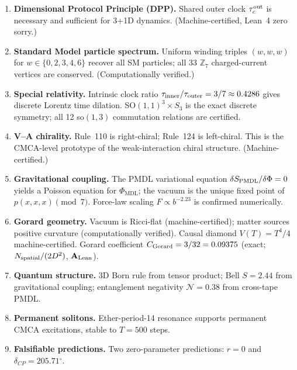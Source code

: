 \documentclass[11pt]{article}
\theoremstyle{remark}
\newcommand{\PHIMDL}{\Phi_{\mathrm{MDL}}}
\newcommand{\ZS}{\mathbb{Z}_7}
\newcommand{\CatAL}{\ensuremath{\textbf{A}_{\rm Lean}}}
\newcommand{\CMCA}{\text{CMCA}}
\newcommand{\taucout}{\tau_c^{\rm out}}
\newcommand{\taucratio}{\tau_{\rm inner}/\tau_{\rm outer}}
\newcommand{\PMDL}{S_{\rm PMDL}}
\begin{document}
\begin{enumerate}[label=(\arabic*)]
  \item \textbf{Dimensional Protocol Principle (DPP).} Shared outer clock
        $\taucout$ is necessary and sufficient for 3+1D dynamics.
        (Machine-certified, Lean~4 zero sorry.)

  \item \textbf{Standard Model particle spectrum.} Uniform winding triples
        $(w,w,w)$ for $w \in \{0,2,3,4,6\}$ recover all SM particles; all 33
        $\ZS$ charged-current vertices are conserved. (Computationally verified.)

  \item \textbf{Special relativity.} Intrinsic clock ratio $\taucratio = 3/7 \approx 0.4286$
        gives discrete Lorentz time dilation. SO$(1,1)^3 \times S_3$ is the exact
        discrete symmetry; all 12 so$(1,3)$ commutation relations are certified.

  \item \textbf{V--A chirality.} Rule~110 is right-chiral; Rule~124 is
        left-chiral. This is the $\CMCA$-level prototype of the weak-interaction
        chiral structure. (Machine-certified.)

  \item \textbf{Gravitational coupling.} The PMDL variational equation
        $\delta\PMDL/\delta\Phi = 0$ yields a Poisson equation for $\PHIMDL$;
        the vacuum is the unique fixed point of $p(x,x,x) \pmod{7}$.
        Force-law scaling $F \propto b^{-2.23}$ is confirmed numerically.

  \item \textbf{Gorard geometry.} Vacuum is Ricci-flat (machine-certified);
        matter sources positive curvature (computationally verified). Causal
        diamond $V(T) = T^4/4$ machine-certified. Gorard coefficient
        $C_{\rm Gorard} = 3/32 = 0.09375$ (exact; $N_{\rm spatial}/(2D^2)$, \CatAL).

  \item \textbf{Quantum structure.} 3D Born rule from tensor product; Bell
        $S = 2.44$ from gravitational coupling; entanglement negativity
        $\mathcal{N} = 0.38$ from cross-tape PMDL.

  \item \textbf{Permanent solitons.} Ether-period-14 resonance supports
        permanent $\CMCA$ excitations, stable to $T = 500$ steps.

  \item \textbf{Falsifiable predictions.} Two zero-parameter predictions:
        $r = 0$ and $\delta_{CP} = 205.71{\ensuremath{{}^\circ}}$.
\end{enumerate}
\end{document}
